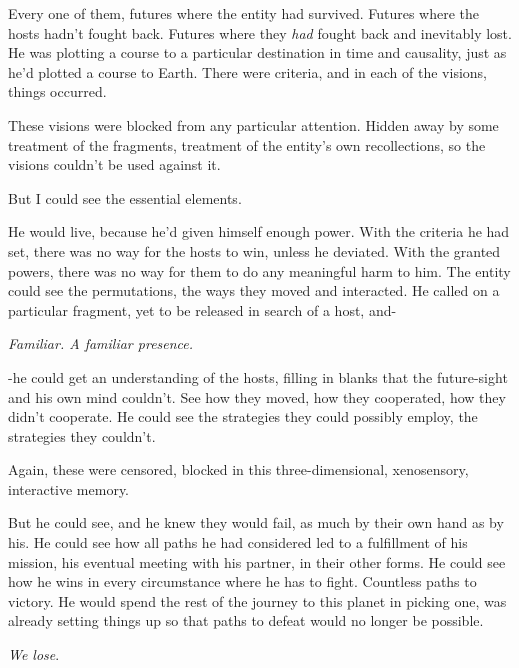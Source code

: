 Every one of them, futures where the entity had survived.  Futures where the hosts hadn't fought back.  Futures where they \emph{had} fought back and inevitably lost.  He was plotting a course to a particular destination in time and causality, just as he'd plotted a course to Earth.  There were criteria, and in each of the visions, things occurred.



These visions were blocked from any particular attention.  Hidden away by some treatment of the fragments, treatment of the entity's own recollections, so the visions couldn't be used against it.



But I could see the essential elements.



He would live, because he'd given himself enough power.  With the criteria he had set, there was no way for the hosts to win, unless he deviated.  With the granted powers, there was no way for them to do any meaningful harm to him.  The entity could see the permutations, the ways they moved and interacted.  He called on a particular fragment, yet to be released in search of a host, and-



\emph{Familiar.  A familiar presence.}



-he could get an understanding of the hosts, filling in blanks that the future-sight and his own mind couldn't.  See how they moved, how they cooperated, how they didn't cooperate.  He could see the strategies they could possibly employ, the strategies they couldn't.



Again, these were censored, blocked in this three-dimensional, xenosensory, interactive memory.



But he could see, and he knew they would fail, as much by their own hand as by his.  He could see how all paths he had considered led to a fulfillment of his mission, his eventual meeting with his partner, in their other forms.  He could see how he wins in every circumstance where he has to fight.  Countless paths to victory.  He would spend the rest of the journey to this planet in picking one, was already setting things up so that paths to defeat would no longer be possible.



\emph{We lose}.



